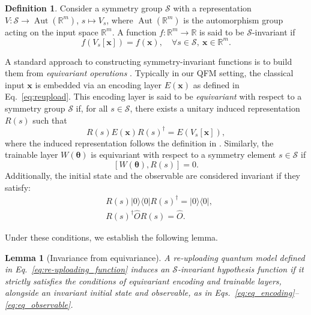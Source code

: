 \documentclass[%
 reprint,
 amsmath,amssymb,
 aps,
 pra,
]{revtex4-2}
\newtheorem{lemma}[theorem]{Lemma}
\theoremstyle{definition}
\newtheorem{definition}[theorem]{Definition}
\begin{document}
\begin{definition}
Consider a symmetry group \(\mathcal{S}\) with a representation \(V:\mathcal{S} \to \operatorname{Aut}(\mathbb{R}^m)\), \(s \mapsto V_s\), where \(\operatorname{Aut}(\mathbb{R}^m)\) is the automorphism group acting on the input space \(\mathbb{R}^m\). A function \(f:\mathbb{R}^m \to \mathbb{R}\) is said to be \(\mathcal{S}\)-invariant if
\begin{equation}
f(V_s[\bm{x}]) = f(\bm{x}), \quad \forall s \in \mathcal{S},\ \bm{x} \in \mathbb{R}^m.
\end{equation}
\end{definition}

A standard approach to constructing symmetry-invariant functions is to build them from \textit{equivariant operations} \cite{Larocca2022,Meyer2023,Cenk2024,Louis2024,Nguyen2024,West2024,nha2025,Das2025}. Typically in our QFM setting, the classical input \(\bm{x}\) is embedded via an encoding layer \(E(\bm{x})\) as defined in Eq.~\eqref{eq:reupload}. This encoding layer is said to be \textit{equivariant} with respect to a symmetry group \(\mathcal{S}\) if, for all \(s\in\mathcal{S}\), there exists a unitary induced representation \(R(s)\) such that
\begin{equation}
\label{eq:eq_encoding}
R(s) E(\bm{x}) R(s)^{\dagger}=E(V_s[\bm{x}]),
\end{equation}
where the induced representation follows the definition in \cite{Meyer2023}. Similarly, the trainable layer \(W(\bm{\theta})\) is equivariant with respect to a symmetry element \(s \in \mathcal S\) if
\begin{equation}
\label{eq:eq_trainable}
[W(\bm{\theta}), R(s)] = 0.
\end{equation}
Additionally, the initial state and the observable are considered invariant if they satisfy:
\begin{align}
\label{eq:eq_init}
&R(s)|0\rangle\langle0|R(s)^\dagger = |0\rangle\langle0|, \\
\label{eq:eq_observable}
&R(s)^\dagger \hat{O} R(s) = \hat{O}.
\end{align}

Under these conditions, we establish the following lemma.

\begin{lemma}[Invariance from equivariance]
\label{lemma:invariance}
A re-uploading quantum model defined in Eq.~\eqref{eq:re-uploading_function} induces an \(\mathcal{S}\)-invariant hypothesis function if it strictly satisfies the conditions of equivariant encoding and trainable layers, alongside an invariant initial state and observable, as in Eqs.~\eqref{eq:eq_encoding}--\eqref{eq:eq_observable}.
\end{lemma}
\end{document}
